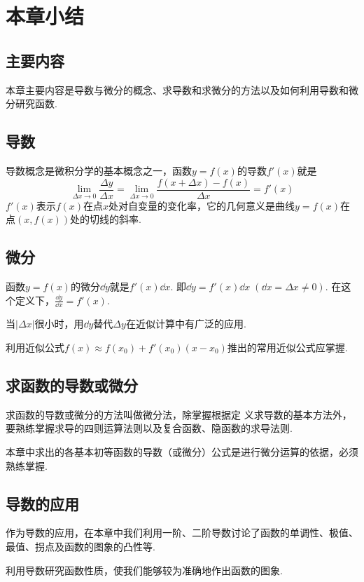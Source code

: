 \section{本章小结}
\subsection{主要内容}
本章主要内容是导数与微分的概念、求导数和求微分的方法以及如何利用导数和微分研究函数.

\subsection{导数}
导数概念是微积分学的基本概念之一，函数$y=f(x)$的导数$f'(x)$就是
\[\lim_{\Delta x\to 0}\frac{\Delta y}{\Delta x}=\lim_{\Delta x\to 0}\frac{f(x+\Delta x)-f(x)}{\Delta x}=f'(x)\]
$f'(x)$表示$f(x)$在点$x$处对自变量的变化率，它的几何意义是曲线$y=f(x)$在点$(x,f(x))$处的切线的斜率.

\subsection{微分}
函数$y=f(x)$的微分$\dd y$就是$f'(x)\dd x$. 即$\dd y=f'(x)\dd x\; (\dd x=\Delta x\ne 0)$. 在这个定义下，$\frac{\dd y}{\dd x}=f'(x)$.

当$|\Delta x|$很小时，用$\dd y$替代$\Delta y$在近似计算中有广泛的应用.

利用近似公式$f(x)\approx f(x_0)+f'(x_0)(x-x_0)$推出的常用近似公式应掌握.

\subsection{求函数的导数或微分}
求函数的导数或微分的方法叫做微分法，除掌握根据定
义求导数的基本方法外，要熟练掌握求导的四则运算法则以及复合函数、隐函数的求导法则.

本章中求出的各基本初等函数的导数（或微分）公式是进行微分运算的依据，必须熟练掌握.

\subsection{导数的应用}
作为导数的应用，在本章中我们利用一阶、二阶导数讨论了函数的单调性、极值、最值、拐点及函数的图象的凸性等.

利用导数研究函数性质，使我们能够较为准确地作出函数的图象.


